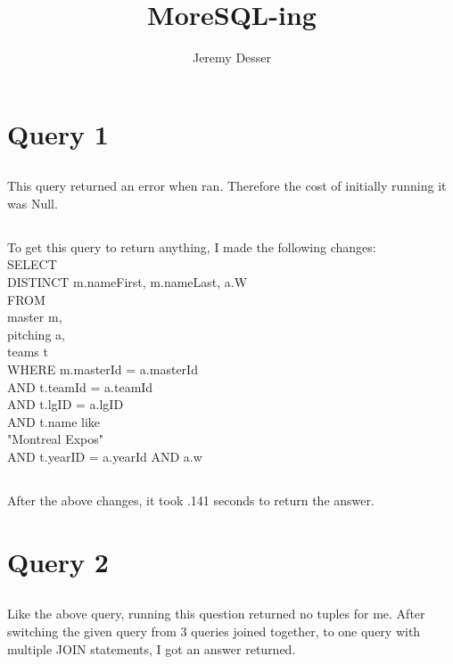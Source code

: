 \documentclass[11pt]{article}
\theoremstyle{plain}
\theoremstyle{definition}
\begin{document}
 


\title{MoreSQL-ing}
\author{Jeremy Desser}
\begin{titlepage}
\maketitle
\end{titlepage}


\section{Query 1} 

\subsection{}This query returned an error when ran. Therefore the cost of initially running it was Null.
\subsection{}
To get this query to return anything, I made the following changes:\\
SELECT \\
    DISTINCT m.nameFirst, m.nameLast, a.W\\
FROM\\
    master m,\\
    pitching a,\\
    teams t\\
WHERE
    m.masterId = a.masterId\\
        AND t.teamId = a.teamId\\
        AND t.lgID = a.lgID\\
        AND t.name like\\
		"Montreal Expos"\\
AND t.yearID = a.yearId AND a.w {}\\


\subsection{}
After the above changes, it took .141 seconds to return the answer.

\section{Query 2}
\subsection{} Like the above query, running this question returned no tuples for me. After switching the given query from 3 queries joined together, to one query with multiple JOIN statements, I got an answer returned.
\end{document}

